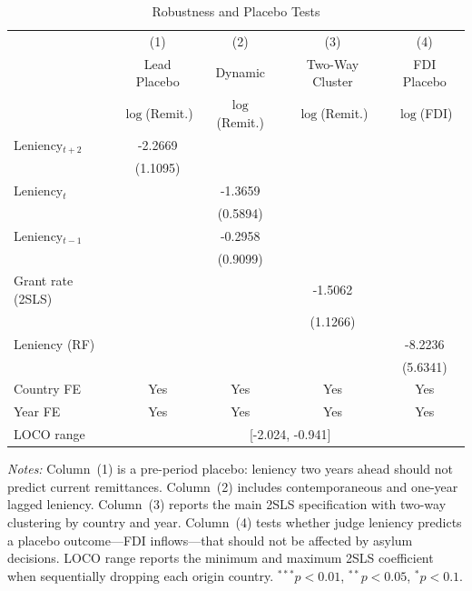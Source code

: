 \begin{table}[!t]
\centering
\caption{Robustness and Placebo Tests}
\label{tab:robust}
\begin{threeparttable}
\begin{tabular}{lcccc}
\hline\hline
 & (1) & (2) & (3) & (4) \\
 & Lead Placebo & Dynamic & Two-Way Cluster & FDI Placebo \\
 & $\log$(Remit.) & $\log$(Remit.) & $\log$(Remit.) & $\log$(FDI) \\
\hline
Leniency$_{t+2}$ & -2.2669 & & & \\
 & (1.1095) & & & \\
Leniency$_{t}$ & & -1.3659 & & \\
 & & (0.5894) & & \\
Leniency$_{t-1}$ & & -0.2958 & & \\
 & & (0.9099) & & \\
Grant rate (2SLS) & & & -1.5062 & \\
 & & & (1.1266) & \\
Leniency (RF) & & & & -8.2236 \\
 & & & & (5.6341) \\
\hline
Country FE & Yes & Yes & Yes & Yes \\
Year FE & Yes & Yes & Yes & Yes \\
LOCO range & \multicolumn{4}{c}{[-2.024, -0.941]} \\
\hline\hline
\end{tabular}
\begin{tablenotes}[flushleft]
\small
\item \textit{Notes:} Column~(1) is a pre-period placebo: leniency two years ahead should not predict current remittances. Column~(2) includes contemporaneous and one-year lagged leniency. Column~(3) reports the main 2SLS specification with two-way clustering by country and year. Column~(4) tests whether judge leniency predicts a placebo outcome---FDI inflows---that should not be affected by asylum decisions. LOCO range reports the minimum and maximum 2SLS coefficient when sequentially dropping each origin country. $^{***}p<0.01$, $^{**}p<0.05$, $^{*}p<0.1$.
\end{tablenotes}
\end{threeparttable}
\end{table}
